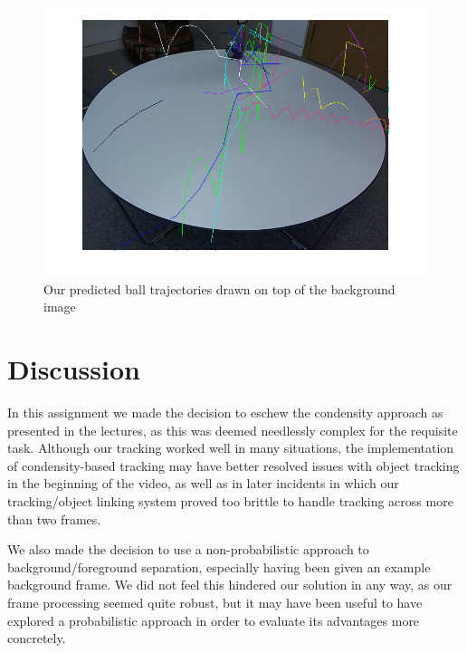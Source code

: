 \documentclass[12pt,a4paper]{article}
\begin{document}
\begin{figure}
	\centering
    \includegraphics[width=140mm]{trajectories.png}
    \caption{Our predicted ball trajectories drawn on top of the background image}
	\label{my-label06}
\end{figure} 

\section{Discussion}
In this assignment we made the decision to eschew the condensity approach as presented in the lectures, as this was deemed needlessly complex for the requisite task. Although our tracking worked well in many situations, the implementation of condensity-based tracking may have better resolved issues with object tracking in the beginning of the video, as well as in later incidents in which our tracking/object linking system proved too brittle to handle tracking across more than two frames.

We also made the decision to use a non-probabilistic approach to background/foreground separation, especially having been given an example background frame. We did not feel this hindered our solution in any way, as our frame processing seemed quite robust, but it may have been useful to have explored a probabilistic approach in order to evaluate its advantages more concretely. 
\end{document}

